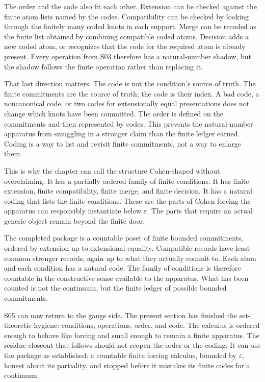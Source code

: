 The order and the code also fit each other. Extension can be checked against
the finite atom lists named by the codes. Compatibility can be checked by
looking through the finitely many coded knots in each support. Merge can be
recoded as the finite list obtained by combining compatible coded atoms.
Decision adds a new coded atom, or recognizes that the code for the required
atom is already present. Every operation from S03 therefore has a
natural-number shadow, but the shadow follows the finite operation rather than
replacing it.

That last direction matters. The code is not the condition's source of truth.
The finite commitments are the source of truth; the code is their index. A bad
code, a noncanonical code, or two codes for extensionally equal presentations
does not change which knots have been committed. The order is defined on the
commitments and then represented by codes. This prevents the natural-number
apparatus from smuggling in a stronger claim than the finite ledger earned.
Coding is a way to list and revisit finite commitments, not a way to enlarge
them.

This is why the chapter can call the structure Cohen-shaped without
overclaiming. It has a partially ordered family of finite conditions. It has
finite extension, finite compatibility, finite merge, and finite decision. It
has a natural coding that lists the finite conditions. These are the parts of
Cohen forcing the apparatus can responsibly instantiate below
\(\varepsilon\). The parts that require an actual generic object remain beyond
the finite door.

The completed package is a countable poset of finite bounded commitments,
ordered by extension up to extensional equality. Compatible records have least
common stronger records, again up to what they actually commit to. Each atom
and each condition has a natural code. The family of conditions is therefore
countable in the constructive sense available to the apparatus. What has been
counted is not the continuum, but the finite ledger of possible bounded
commitments.

S05 can now return to the gauge side. The present section has finished the
set-theoretic hygiene: conditions, operations, order, and code. The calculus is
ordered enough to behave like forcing and small enough to remain a finite
apparatus. The residue closeout that follows should not reopen the order or
the coding. It can use the package as established: a countable finite forcing
calculus, bounded by \(\varepsilon\), honest about its partiality, and stopped
before it mistakes its finite codes for a continuum.

